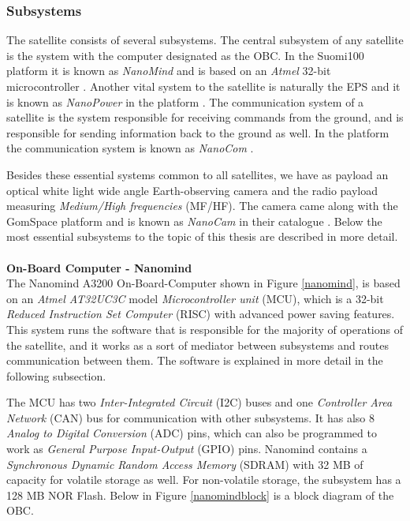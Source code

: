 \documentclass[english,12pt,a4paper,pdftex,elec,utf8]{aaltothesis}
\begin{document}
\subsubsection{Subsystems}
The satellite consists of several subsystems. The central subsystem of any satellite is the system with the computer designated as the OBC. In the Suomi100 platform it is known as \textit{NanoMind} and is based on an \textit{Atmel} 32-bit microcontroller \cite{nanomindds}. Another vital system to the satellite is naturally the EPS and it is known as \textit{NanoPower} in the platform \cite{nanopowerds}. The communication system of a satellite is the system responsible for receiving commands from the ground, and is responsible for sending information back to the ground as well. In the platform the communication system is known as \textit{NanoCom} \cite{nanocomds}. \par
Besides these essential systems common to all satellites, we have as payload an optical white light wide angle Earth-observing camera and the radio payload measuring \textit{Medium/High frequencies} (MF/HF). The camera came along with the GomSpace platform and is known as \textit{NanoCam} in their catalogue \cite{nanocamds}. Below the most essential subsystems to the topic of this thesis are described in more detail. 
\\
\\
\textbf{On-Board Computer - Nanomind}\\
The Nanomind A3200 On-Board-Computer shown in Figure \ref{nanomind}, is based on an \textit{Atmel AT32UC3C} model \textit{Microcontroller unit} (MCU), which is a 32-bit \textit{Reduced Instruction Set Computer} (RISC) with advanced power saving features. This system runs the software that is responsible for the majority of operations of the satellite, and it works as a sort of mediator between subsystems and routes communication between them. The software is explained in more detail in the following subsection. \par
The MCU has two \textit{Inter-Integrated Circuit} (I2C) buses and one \textit{Controller Area Network} (CAN) bus for communication with other subsystems. It has also 8  \textit{Analog to Digital Conversion} (ADC) pins, which can also be programmed to work as \textit{General Purpose Input-Output} (GPIO) pins. Nanomind contains a \textit{Synchronous Dynamic Random Access Memory} (SDRAM) with 32 MB of capacity for volatile storage as well. For non-volatile storage, the subsystem has a 128 MB NOR Flash. Below in Figure \ref{nanomindblock} is a block diagram of the OBC. \cite{nanomindds}\\
\end{document}
